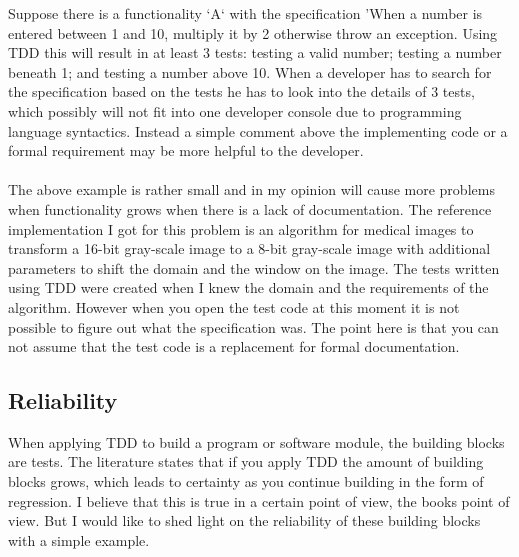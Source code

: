 \begin{itshape}
\begin{addmargin}[1em]{1em}
Suppose there is a functionality `A` with the specification 'When a number is entered between 1 and 10, multiply it by
2 otherwise throw an exception. Using TDD this will result in at least 3 tests: testing a valid number; testing a
number beneath 1; and testing a number above 10. When a developer has to search for the specification based on the
tests he has to look into the details of 3 tests, which possibly will not fit into one developer console due to
programming language syntactics. Instead a simple comment above the implementing code or a formal requirement may be
more helpful to the developer.
\end{addmargin}
\end{itshape}

\paragraph{}
The above example is rather small and in my opinion will cause more problems when functionality grows when there is a
lack of documentation. The reference implementation I got for this problem is an algorithm for medical images to
transform a 16-bit gray-scale image to a 8-bit gray-scale image with additional parameters to shift the domain and the
window on the image. The tests written using TDD were created when I knew the domain and the requirements of the
algorithm. However when you open the test code at this moment it is not possible to figure out what the specification
was. The point here is that you can not assume that the test code is a replacement for formal documentation.

\subsection*{Reliability}

When applying TDD to build a program or software module, the building blocks are tests. The literature states that if
you apply TDD the amount of building blocks grows, which leads to certainty as you continue building in the form of
regression. I believe that this is true in a certain point of view, the books point of view. But I would like to shed
light on the reliability of these building blocks with a simple example. \\


